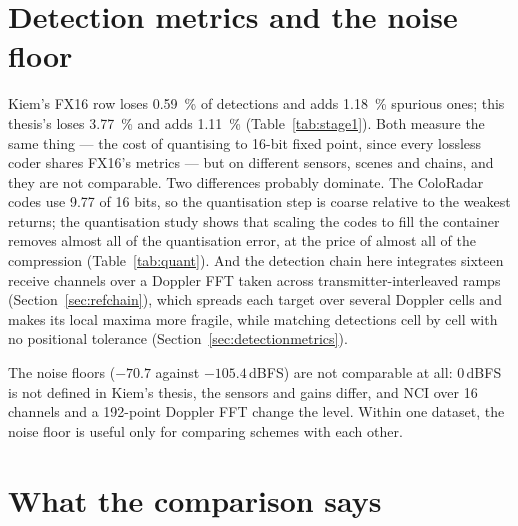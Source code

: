\section{Detection metrics and the noise floor}
\label{sec:kc_det}

Kiem's FX16 row loses \SI{0.59}{\percent} of detections and adds
\SI{1.18}{\percent} spurious ones; this thesis's loses \SI{3.77}{\percent} and
adds \SI{1.11}{\percent} (Table~\ref{tab:stage1}). Both measure the same thing
--- the cost of quantising to 16-bit fixed point, since every lossless coder
shares FX16's metrics --- but on different sensors, scenes and chains, and they
are not comparable. Two differences probably dominate. The ColoRadar codes use
9.77 of 16 bits, so the quantisation step is coarse relative to the weakest
returns; the quantisation study shows that scaling the codes to fill the
container removes almost all of the quantisation error, at the price of almost
all of the compression (Table~\ref{tab:quant}). And the detection chain here
integrates sixteen receive channels over a Doppler FFT taken across
transmitter-interleaved ramps (Section~\ref{sec:refchain}), which spreads each
target over several Doppler cells and makes its local maxima more fragile,
while matching detections cell by cell with no positional tolerance
(Section~\ref{sec:detectionmetrics}).

The noise floors ($-70.7$ against $-105.4$\,dBFS) are not comparable at all:
0\,dBFS is not defined in Kiem's thesis, the sensors and gains differ, and NCI
over 16 channels and a 192-point Doppler FFT change the level. Within one
dataset, the noise floor is useful only for comparing schemes with each other.

\section{What the comparison says}
\label{sec:kc_summary}

